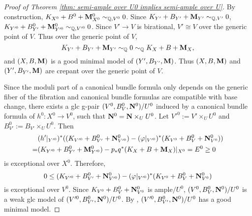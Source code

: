 \documentclass[11pt]{amsart}
\numberwithin{equation}{section}
\newcommand{\Mm}{{\bf{M}}}
\newcommand{\NN}{{\bf{N}}}
\theoremstyle{definition}
\theoremstyle{definition}
\theoremstyle{definition}
\begin{document}
\begin{proof}[Proof of Theorem \ref{thm: semi-ample over U0 implies
  semi-ample over U}]
  By construction, $K_{X^0}+B^0+\Mm^0_{X^0}\sim_{\mathbb Q,V^0}0$.
  Since $K_{Y'}+B_{Y'}+\Mm_{Y'}\sim_{\mathbb Q,V'}0$,
  $K_{Y'^0}+B^0_{Y'}+\Mm^0_{Y'^0}\sim_{\mathbb Q,V'^0}0$. Since
  $V'\rightarrow V$ is birational, $V'\cong V$ over the generic point
  of $V$. Thus over the generic point of $V$,
  $$K_{Y'}+B_{Y'}+\Mm_{Y'}\sim_{\mathbb Q}0\sim_{\mathbb Q}K_{X}+B+\Mm_{X},$$
  and $(X,B,\Mm)$ is a good minimal model of $(Y',B_{Y'},\Mm)$. Thus
  $(X,B,\Mm)$ and $(Y',B_{Y'},\Mm)$ are crepant over the generic point of $V$.

  Since the moduli part of a canonical bundle formula only depends on
  the generic fiber of the fibration and canonical bundle formulas
  are compatible with base change, there exists a glc g-pair
  $(V^0,B^0_{V},\NN^0)/U^0$ induced by a canonical bundle formula of
  $h^0: X^0\rightarrow V^0$, such that $\NN^0=\NN\times_UU^0$. Let
  $V'^0:=V'\times_UU^0$ and $B^0_{V'}:=B_{V'}\times_UU^0$. Then
  \begin{align*}
    &(h'|_{Y'^0})^*((K_{V'^0}+B^0_{V'}+\NN^0_{V'^0})-(\varphi|_{V'^0})^*(K_{V^0}+B^0_{V}+\NN^0_{V^0}))\\
    =&(K_{Y'^0}+B^0_{Y'}+\Mm^0_{Y'^0})-p_*q^*(K_X+B+\Mm_X)|_{X^0}=E^0\geq 0
  \end{align*}
  is exceptional over $X^0$. Therefore, $$0\leq
  (K_{V'^0}+B^0_{V'}+\NN^0_{V'^0})-(\varphi|_{V'^0})^*(K_{V^0}+B^0_{V}+\NN^0_{V^0})$$
  is exceptional over $V^0$. Since $K_{V^0}+B^0_{V}+\NN^0_{V^0}$ is
  ample$/U^0$, $(V^0,B^0_{V},\NN^0)/U^0$ is a weak glc model of
  $(V'^0,B^0_{V'},\NN^0)/U^0$. By \cite[Lemmas 3.9, 3.15]{HL21a},
  $(V'^0,B^0_{V'},\NN^0)/U^0$ has a good minimal model.


\end{proof}
\end{document}
